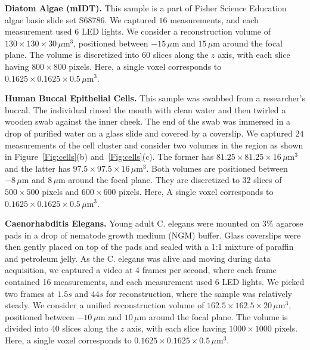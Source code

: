 \documentclass[11pt]{article}
\theoremstyle{plain} %
\begin{document}
\vspace{0.5em}
\noindent\textbf{Diatom Algae (mIDT).}
This sample is a part of Fisher Science Education algae basic slide set S68786.
We captured $16$ measurements, and each measurement used $6$ LED lights.  
We consider a reconstruction volume of $130 \times 130 \times 30\,\mu$m$^3$, positioned between $-15\,\mu$m and $15\,\mu$m around the focal plane. The volume is discretized into 60 slices along the $z$ axis, with each slice having $800 \times 800$ pixels. Here, a single voxel corresponds to $0.1625 \times 0.1625 \times 0.5\,\mu$m$^3$.

\vspace{0.5em}
\noindent\textbf{Human Buccal Epithelial Cells.} This sample was swabbed from a researcher's buccal.
The individual rinsed the mouth with clean water and then twirled a wooden swab against the inner cheek.
The end of the swab was immersed in a drop of purified water on a glass slide and covered by a coverslip. 
We captured $24$ measurements of the cell cluster and consider two volumes in the region as shown in Figure~\ref{Fig:cells}(b) and~\ref{Fig:cells}(c). The former has $81.25\times81.25\times16\,\mu$m$^3$ and the latter has $97.5\times97.5\times16\,\mu$m$^3$. Both volumes are positioned between $-8\,\mu$m and $8\,\mu$m around the focal plane. They are discretized to $32$ slices of $500 \times 500$ pixels and $600\times600$ pixels. Here, A single voxel corresponds to $0.1625 \times 0.1625 \times 0.5\,\mu$m$^3$.

\vspace{0.5em}
\noindent
\textbf{Caenorhabditis Elegans.} Young adult C. elegans were mounted on $3\%$ agarose pads in a drop of nematode growth medium (NGM) buffer. Glass coverslips were then gently placed on top of the pads and sealed with a 1:1 mixture of paraffin and petroleum jelly. 
As the C. elegans was alive and moving during data acquisition, we captured a video at 4 frames per second, where each frame contained 16 measurements, and each measurement used $6$ LED lights. 
We picked two frames at $1.5s$ and $44s$ for reconstruction, where the sample was relatively steady. We consider a unified reconstruction volume of $162.5 \times 162.5 \times 20\,\mu \text{m}^3$, positioned between $-10\,\mu$m and $10\,\mu$m around the focal plane. 
The volume is divided into $40$ slices along the $z$ axis, with each slice having $1000 \times 1000$ pixels. Here, a single voxel corresponds to $0.1625 \times 0.1625 \times 0.5\,\mu$m$^3$.
\end{document}
